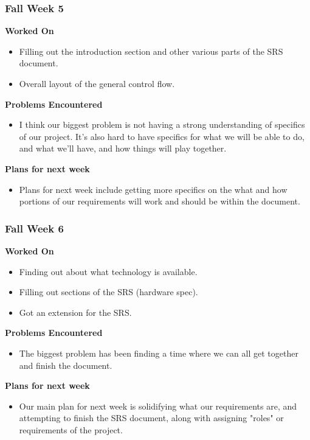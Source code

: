 \documentclass[compsoc,draftclsnofoot,onecolumn,10pt]{IEEEtran}
\begin{document}
\subsubsection*{Fall Week 5}
\textbf{Worked On}
\begin{itemize}
    \item Filling out the introduction section and other various parts of the SRS document.
    \item Overall layout of the general control flow.
\end{itemize}
\textbf{Problems Encountered}
\begin{itemize}
    \item I think our biggest problem is not having a strong understanding of specifics of our project. It's also hard to have specifics for what we will be able to do, and what we'll have, and how things will play together.
\end{itemize}
\textbf{Plans for next week}
\begin{itemize}
    \item Plans for next week include getting more specifics on the what and how portions of our requirements will work and should be within the document.
\end{itemize}


\subsubsection*{Fall Week 6}
\textbf{Worked On}
\begin{itemize}
    \item Finding out about what technology is available. 
    \item Filling out sections of the SRS (hardware spec).
    \item Got an extension for the SRS.
\end{itemize}
\textbf{Problems Encountered}
\begin{itemize}
    \item The biggest problem has been finding a time where we can all get together and finish the document.
\end{itemize}
\textbf{Plans for next week}
\begin{itemize}
    \item Our main plan for next week is solidifying what our requirements are, and attempting to finish the SRS document, along with assigning "roles" or requirements of the project.
\end{itemize}
    
\end{document}
